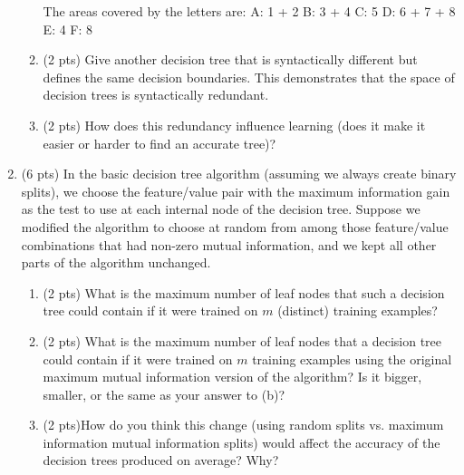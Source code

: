 \documentclass{article}
\begin{document}
\begin{enumerate}
\begin{enumerate}
The areas covered by the letters are: \newline
A: 1 + 2 \newline
B: 3 + 4 \newline
C: 5 \newline
D: 6 + 7 + 8 \newline
E: 4 \newline
F: 8 \newline

\item (2 pts) Give another decision tree that is syntactically
different but defines the same decision boundaries.  This
demonstrates that the space of decision trees is
syntactically redundant.  \\


\item (2 pts) How does this redundancy influence learning (does it make it easier or harder to find an accurate tree)?\\

\end{enumerate}
\item (6 pts) In the basic decision tree algorithm (assuming we always create binary splits), we choose the feature/value pair with the maximum information gain as the test to use at each internal node of the decision tree.  Suppose we modified the algorithm to choose at random from among those feature/value combinations that had non-zero mutual information, and we kept all other parts of the algorithm unchanged.

\begin{enumerate}
\item (2 pts) What is the maximum number of leaf nodes that such a
decision tree could contain if it were trained on $m$ (distinct)
training examples?


\item (2 pts) What is the maximum number of leaf nodes that a decision
tree could contain if it were trained on $m$ training
examples using the original maximum mutual information
version of the algorithm?  Is it bigger, smaller, or the
same as your answer to (b)?


\item (2 pts)How do you think this change (using random splits vs. maximum information mutual information splits) would affect the accuracy of the decision trees produced on average?  Why?


\end{enumerate}
\end{enumerate}
\end{document}
